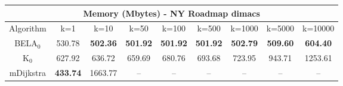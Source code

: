 \begin{tabular}{c|cccccccc}\toprule
\multicolumn{9}{c}{Memory (Mbytes) - NY Roadmap dimacs}\\ \midrule
Algorithm & k=1 & k=10 & k=50 & k=100 & k=500 & k=1000 & k=5000 & k=10000 \\ \midrule
BELA$_0$ & 530.78 & \textbf{502.36} & \textbf{501.92} & \textbf{501.92} & \textbf{501.92} & \textbf{502.79} & \textbf{509.60} & \textbf{604.40} \\
K$_0$ & 627.92 & 636.72 & 659.69 & 680.76 & 693.68 & 723.95 & 943.71 & 1253.61 \\
mDijkstra & \textbf{433.74} & 1663.77 & -- & -- & -- & -- & -- & -- \\ \bottomrule 
\end{tabular}

